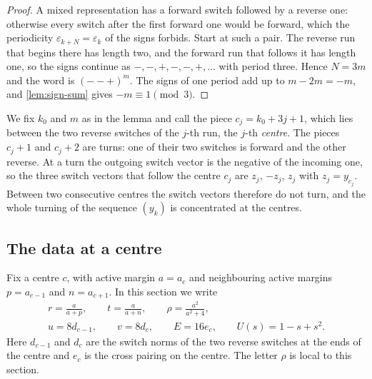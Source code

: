 \begin{proof}
  A mixed representation has a forward switch followed by a reverse one: otherwise every switch
  after the first forward one would be forward, which the periodicity $\varepsilon_{k+N}=\varepsilon_k$
  of the signs forbids. Start at such a pair. The reverse run that begins there has length two,
  and the forward run that follows it has length one, so the signs continue as
  $-,-,+,-,-,+,\dots$ with period three. Hence $N=3m$ and the word is $(--+)^m$. The signs of one
  period add up to $m-2m=-m$, and \cref{lem:sign-sum} gives $-m\equiv1\pmod3$.
\end{proof}

We fix $k_0$ and $m$ as in the lemma and call the piece $c_j=k_0+3j+1$, which lies between the two
reverse switches of the $j$-th run, the $j$-th \emph{centre}. The pieces $c_j+1$ and $c_j+2$ are
turns: one of their two switches is forward and the other reverse. At a turn the outgoing switch
vector is the negative of the incoming one, so the three switch vectors that follow the centre
$c_j$ are $z_j$, $-z_j$, $z_j$ with $z_j=y_{c_j}$. Between two consecutive centres the switch
vectors therefore do not turn, and the whole turning of the sequence $(y_k)$ is concentrated at
the centres.

\subsection{The data at a centre}

Fix a centre $c$, with active margin $a=a_c$ and neighbouring active margins $p=a_{c-1}$ and
$n=a_{c+1}$. In this section we write
\begin{equation}\label{eq:m1-variables}
  \begin{gathered}
    r=\frac a{a+p},\qquad t=\frac a{a+n},\qquad \rho=\frac{a^2}{a^2+4},\\
    u=8d_{c-1},\qquad v=8d_c,\qquad E=16e_c,\qquad U(s)=1-s+s^2.
  \end{gathered}
\end{equation}
Here $d_{c-1}$ and $d_c$ are the switch norms of the two reverse switches at the ends of the
centre and $e_c$ is the cross pairing on the centre. The letter $\rho$ is local to this section.

